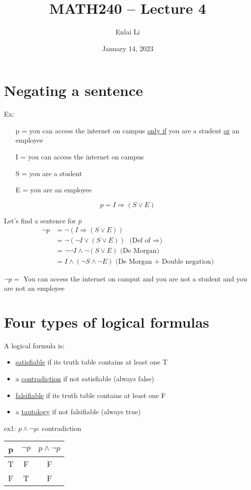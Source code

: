 \documentclass{article}
\author{Enlai Li}
\title{MATH240 -- Lecture 4}
\date{January 14, 2023}
\begin{document}
\maketitle
\section{Negating a sentence}
Ex:
\begin{itemize}
    \item [p =] you can access the internet on campus \underline{only if} you are a student \underline{or} an employee
    \item [I =] you can access the internet on campus
    \item [S =] you are a student
    \item [E =] you are an employee
\end{itemize}
\[
    p = I \Rightarrow (S \lor E)
\]

Let's find a sentence for $\overline{p}$
\begin{align*}
    \lnot p
     & = \lnot (I \Rightarrow (S \lor E))
    \\ & = \lnot (\lnot I \lor (S \lor E)) \text{ (Def of $\Rightarrow $)}
    \\ & = \lnot \lnot I \land \lnot(S \lor E) \text{ (De Morgan)}
    \\ & =  I \land (\lnot S \land \lnot E) \text{ (De Morgan + Double negation)}
\end{align*}

$ \lnot p =$ You can access the internet on camput and you are not a student and you are not an employee

\section{Four types of logical formulas}
A logical formula is:
\begin{itemize}
    \item \underline{satisfiable} if its truth table contains at least one T
    \item a \underline{contradiction} if not satisfiable (always false)
    \item \underline{falsifiable} if its truth table contains at least one F
    \item a \underline{tautology} if not falsifiable (always true)
\end{itemize}
\clearpage

ex1: $p \land \lnot p$: contradiction
\begin{table}[h]
    \begin{center}
        \begin{tabular}{c|c|c}
            p & $\lnot p$ & $p \land \lnot p$ \\
            \hline
            T & F         & F                 \\
            F & T         & F
        \end{tabular}
    \end{center}
\end{table}
\end{document}
